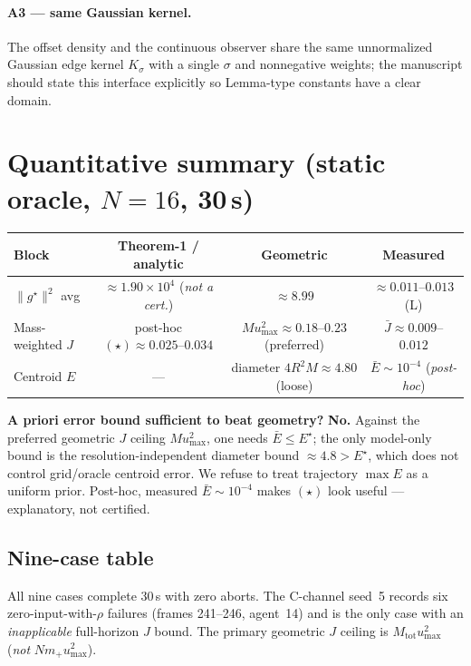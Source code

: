 \documentclass[11pt]{article}
\newcommand{\gstar}{g^\star}
\newcommand{\umax}{u_{\max}}
\begin{document}
\paragraph{A3 --- same Gaussian kernel.} The offset density and the continuous
observer share the same unnormalized Gaussian edge kernel $K_\sigma$ with a
single $\sigma$ and nonnegative weights; the manuscript should state this
interface explicitly so Lemma-type constants have a clear domain.

\section{Quantitative summary (static oracle, $N=16$, 30\,s)}

\begin{center}
\begin{tabular}{lccc}
\toprule
Block & Theorem-1 / analytic & Geometric & Measured \\
\midrule
$\|\gstar\|^2$ avg & $\approx1.90\times10^4$ (\emph{not a cert.}) & $\approx8.99$ & $\approx0.011$--$0.013$ (L) \\
Mass-weighted $J$ & post-hoc $(\star)\approx0.025$--$0.034$ & $M\umax^2\approx0.18$--$0.23$ (preferred) & $\bar J\approx0.009$--$0.012$ \\
Centroid $E$ & --- & diameter $4R^2M\approx4.80$ (loose) & $\bar E\sim10^{-4}$ (\emph{post-hoc}) \\
\bottomrule
\end{tabular}
\end{center}

\noindent\textbf{A priori error bound sufficient to beat geometry?} \textbf{No.}
Against the preferred geometric $J$ ceiling $M\umax^2$, one needs $\bar E\le
E^\star$; the only model-only bound is the resolution-independent diameter bound
$\approx4.8>E^\star$, which does not control grid/oracle centroid error. We
refuse to treat trajectory $\max E$ as a uniform prior. Post-hoc, measured
$\bar E\sim10^{-4}$ makes $(\star)$ look useful --- explanatory, not certified.

\subsection{Nine-case table}
All nine cases complete 30\,s with zero aborts. The C-channel seed~5 records six
zero-input-with-$\rho$ failures (frames 241--246, agent~14) and is the only case
with an \emph{inapplicable} full-horizon $J$ bound. The primary geometric $J$
ceiling is $M_{\mathrm{tot}}\umax^2$ (\emph{not} $N m_+\umax^2$).
\end{document}
